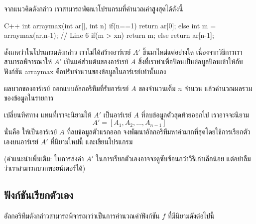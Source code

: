 จาก{\wbr}แนว{\wbr}คิด{\wbr}ดังกล่าว เรา{\wbr}สามารถ{\wbr}พัฒนา{\wbr}โปรแกรม{\wbr}ที่{\wbr}คำนวณ{\wbr}ค่าสูงสุด{\wbr}ได้{\wbr}ดังนี้{\wbr}

\latintext
\begin{codelist}{C++}{}
int arraymax(int ar[], int n)
{
  if(n==1)
    return ar[0];
  else {
    int m = arraymax(ar,n-1);   // Line 6
    if(m > xn)
      return m;
    else
      return ar[n-1];
  }
}
\end{codelist}
\thaitext

สังเกต{\wbr}ว่า{\wbr}ใน{\wbr}โปรแกรม{\wbr}ดังกล่าว เรา{\wbr}ไม่{\wbr}ได้{\wbr}สร้าง{\wbr}อาร์เรย์ $A'$ ขึ้น{\wbr}มา{\wbr}ใหม่{\wbr}แต่อย่างใด{\wbr}
เนื่องจาก{\wbr}วิธีการ{\wbr}เรา{\wbr}สามารถ{\wbr}พิจารณา{\wbr}ให้ $A'$ เป็น{\wbr}แค่{\wbr}ส่วน{\wbr}ต้น{\wbr}ของ{\wbr}อาร์เรย์ $A$
สิ่ง{\wbr}ที่{\wbr}เรา{\wbr}ทำ{\wbr}เพื่อ{\wbr}ป้อน{\wbr}เป็น{\wbr}ข้อมูล{\wbr}ป้อน{\wbr}เข้า{\wbr}ให้{\wbr}กับ{\wbr}ฟังก์ชัน {\ct arraymax}
คือ{\wbr}ปรับ{\wbr}จำนวน{\wbr}ของ{\wbr}ข้อมูล{\wbr}ใน{\wbr}อาร์เรย์{\wbr}เท่านั้น{\wbr}เอง{\wbr}

\begin{quiz}{ผลบวก{\wbr}ของ{\wbr}อาร์เรย์}
ออกแบบ{\wbr}อัล{\wbr}กอ{\wbr}ริ{\wbr}ทึม{\wbr}ที่{\wbr}รับ{\wbr}อาร์เรย์ $A$ ของ{\wbr}จำนวนเต็ม $n$ จำนวน{\wbr}
แล้ว{\wbr}คำนวณ{\wbr}ผลรวม{\wbr}ของ{\wbr}ข้อมูล{\wbr}ใน{\wbr}รายการ{\wbr}
\end{quiz}

\begin{quiz}{เปลี่ยน{\wbr}ทิศทาง}
\label{quiz:rec-array-max-alt}
แทน{\wbr}ที่{\wbr}เรา{\wbr}จะ{\wbr}นิยาม{\wbr}ให้ $A'$ เป็น{\wbr}อาร์เรย์ $A$ ที่{\wbr}ลบ{\wbr}ข้อมูล{\wbr}ตัว{\wbr}สุดท้าย{\wbr}ออก{\wbr}ไป เรา{\wbr}อาจ{\wbr}จะ{\wbr}นิยาม{\wbr}
\[
A'=[A_1,A_2,\ldots,A_{n-1}]
\]
นั่น{\wbr}คือ ให้{\wbr}เป็น{\wbr}อาร์เรย์ $A$ ที่{\wbr}ลบ{\wbr}ข้อมูล{\wbr}ตัว{\wbr}แรก{\wbr}ออก{\wbr}
จง{\wbr}พัฒนา{\wbr}อัล{\wbr}กอ{\wbr}ริ{\wbr}ทึม{\wbr}หา{\wbr}ค่า{\wbr}มาก{\wbr}ที่สุด{\wbr}โดย{\wbr}ใช้{\wbr}การ{\wbr}เรียก{\wbr}ตัวเอง{\wbr}บน{\wbr}อาร์เรย์ $A'$ ที่{\wbr}นิยาม{\wbr}ใหม่{\wbr}นี้{\wbr}
และ{\wbr}เขียน{\wbr}โปรแกรม{\wbr}

(คำแนะนำ{\wbr}เพิ่มเติม: ใน{\wbr}การ{\wbr}ส่ง{\wbr}ค่า $A'$ ใน{\wbr}การ{\wbr}เรียก{\wbr}ตัวเอง{\wbr}อาจ{\wbr}จะ{\wbr}ดู{\wbr}ซับซ้อน{\wbr}กว่า{\wbr}วิธี{\wbr}เก่า{\wbr}เล็กน้อย{\wbr}
แต่{\wbr}อย่า{\wbr}ลืม{\wbr}ว่า{\wbr}เรา{\wbr}สามารถ{\wbr}บวก{\wbr}พอยน์เตอร์{\wbr}ได้)
\end{quiz}



\subsection{ฟังก์ชัน{\wbr}เรียก{\wbr}ตัวเอง}
อัล{\wbr}กอ{\wbr}ริ{\wbr}ทึม{\wbr}ดังกล่าว{\wbr}สามารถ{\wbr}พิจารณา{\wbr}ว่า{\wbr}เป็น{\wbr}การ{\wbr}คำนวณ{\wbr}ค่า{\wbr}ฟังก์ชัน $f$ ที่{\wbr}มี{\wbr}นิยาม{\wbr}ดังต่อไปนี้{\wbr}

